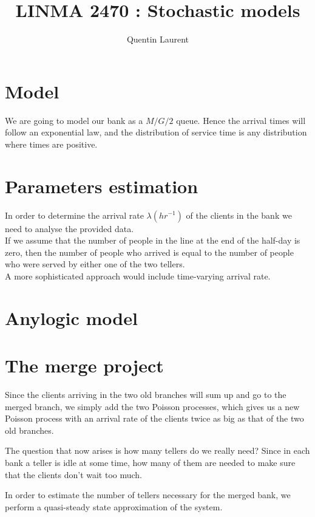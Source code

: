 \documentclass[12pt,a4paper,notitlepage]{report}
\title{LINMA 2470 : Stochastic models}
\author{Quentin Laurent}
\begin{document}
\maketitle
\section*{Model}
We are going to model our bank as a $M/G/2$ queue. Hence the arrival times will follow an exponential law, and the distribution of service time is any distribution where times are positive.
\section*{Parameters estimation}
In order to determine the arrival rate $\lambda (hr^{-1})$ of the clients in the bank we need to analyse the provided data.\\
If we assume that the number of people in the line at the end of the half-day is zero, then the number of people who arrived is equal to the number of people who were served by either one of the two tellers.\\
A more sophisticated approach would include time-varying arrival rate.


\section*{Anylogic model}


\section*{The merge project}
 Since the clients arriving in the two old branches will sum up and go to the merged branch, we simply add the two Poisson processes, which gives us a new Poisson process with an arrival rate of the clients twice as big as that of the two old branches.

The question that now arises is how many tellers do we really need? Since in each bank a teller is idle at some time, how many of them are needed to make sure that the clients don't wait too much.


In order to estimate the number of tellers necessary for the merged bank, we perform a quasi-steady state approximation of the system. 
\end{document}
